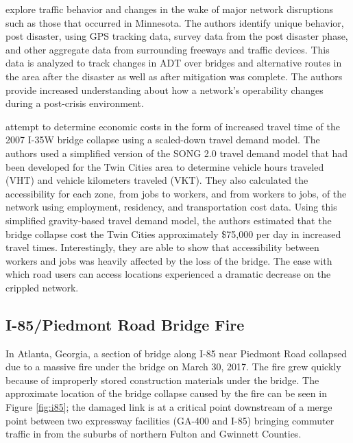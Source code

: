 \citet{levinson2010} explore traffic behavior and changes in the wake of
major network
disruptions such as those that occurred in Minnesota. The authors identify
unique behavior, post
disaster, using GPS tracking data, survey data from the post disaster
phase, and other aggregate
data from surrounding freeways and traffic devices. This data is
analyzed to track
changes in ADT over bridges and alternative routes in the area after the
disaster as well as
after mitigation was complete. The authors provide increased
understanding about how a
network's operability changes during a post-crisis environment.

\citet{xie2011} attempt to determine economic costs in the form of
increased travel time
of the 2007 I-35W bridge collapse using a scaled-down travel demand model.
The authors used a
simplified version of the SONG 2.0 travel demand model that had been
developed for the Twin
Cities area to determine vehicle hours traveled (VHT) and vehicle
kilometers traveled (VKT). They
also calculated the accessibility for each zone, from jobs to workers, and
from workers to jobs, of
the network using employment, residency, and transportation cost data.
Using this simplified
gravity-based travel demand model, the authors estimated that the bridge collapse cost the Twin
Cities approximately
\$75,000 per day in increased travel times. Interestingly, they are able to
show that accessibility between workers and jobs was heavily affected by the
loss of the bridge. The ease with which road users can access locations
experienced a dramatic decrease on the crippled network.

\subsection{I-85/Piedmont Road Bridge Fire}

In Atlanta, Georgia, a section of bridge along I-85 near Piedmont Road collapsed due to a
massive fire under the bridge
on March 30, 2017. The fire grew
quickly because of
improperly stored construction materials under the bridge. The approximate
location of the bridge
collapse caused by the fire can be seen in Figure \ref{fig:i85}; the damaged link is
at a critical point
downstream of a merge point between two expressway facilities (GA-400 and
I-85) bringing commuter
traffic in from the suburbs of northern Fulton and Gwinnett Counties.

